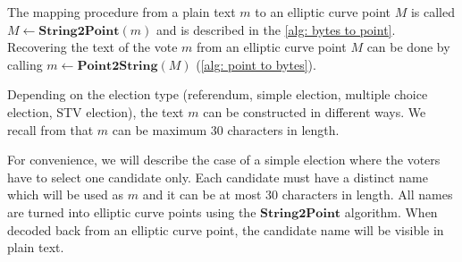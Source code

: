 The mapping procedure from a plain text $m$ to an elliptic curve point $M$ is called \( M \leftarrow \mathbf{String2Point}(m) \) and is described in the \cref{alg: bytes to point}. Recovering the text of the vote $m$ from an elliptic curve point $M$ can be done by calling \( m \leftarrow \mathbf{Point2String}(M) \) (\cref{alg: point to bytes}).

Depending on the election type (referendum, simple election, multiple choice election, STV election), the text $m$ can be constructed in different ways. We recall from  that $m$ can be maximum 30 characters in length. 

For convenience, we will describe the case of a simple election where the voters have to select one candidate only. Each candidate must have a distinct name which will be used as $m$ and it can be at most 30 characters in length. All names are turned into elliptic curve points using the $\textbf{String2Point}$ algorithm. When decoded back from an elliptic curve point, the candidate name will be visible in plain text.



\color{orange}
